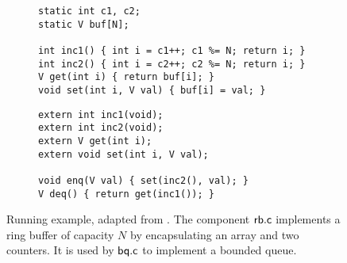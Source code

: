 \begin{figure}[t!]
  \center
  \hspace{-5.5em}
  \begin{subfigure}{0.6\textwidth}
\begin{verbatim}
static int c1, c2;
static V buf[N];

int inc1() { int i = c1++; c1 %= N; return i; }
int inc2() { int i = c2++; c2 %= N; return i; }
V get(int i) { return buf[i]; }
void set(int i, V val) { buf[i] = val; }
\end{verbatim}
    \vspace{-1em}
    \label{fig:rb}
  \end{subfigure}
  \hspace{0.5em}
  \begin{subfigure}{0.48\textwidth}
\begin{verbatim}
extern int inc1(void);
extern int inc2(void);
extern V get(int i);
extern void set(int i, V val);

void enq(V val) { set(inc2(), val); }
V deq() { return get(inc1()); }
\end{verbatim}
    \vspace{-1em}
    \label{fig:bq}
  \end{subfigure}
  \hspace{-5.5em}
  \caption{Running example, adapted from \citet{rbgs-cal}.
    The component $ \mathsf{rb.c} $
    implements a ring buffer of capacity $N$
    by encapsulating an array
    and two counters. It is used by %
    $ \mathsf{bq.c} $ to implement a
  bounded queue.}
  \label{fig:bq-code}
\end{figure}
